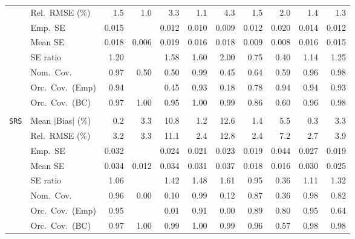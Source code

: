 \begin{landscape}
\begin{longtable}{llrrrrrrrrr}
 & Rel.\ RMSE (\%) & 1.5 & \cellcolor{rankone}1.0 & 3.3 & \cellcolor{ranktwo}1.1 & 4.3 & 1.5 & 2.0 & 1.4 & \cellcolor{rankthree}1.3 \\
 & Emp.\ SE & 0.015 &  & 0.012 & 0.010 & 0.009 & 0.012 & 0.020 & 0.014 & 0.012 \\
 & Mean SE & 0.018 & 0.006 & 0.019 & 0.016 & 0.018 & 0.009 & 0.008 & 0.016 & 0.015 \\
 & SE ratio & \cellcolor{ranktwo}1.20 &  & 1.58 & 1.60 & 2.00 & \cellcolor{rankthree}0.75 & 0.40 & \cellcolor{rankone}1.14 & \cellcolor{rankthree}1.25 \\
 & Nom.\ Cov. & \cellcolor{ranktwo}0.97 & 0.50 & 0.50 & 0.99 & 0.45 & 0.64 & 0.59 & \cellcolor{rankone}0.96 & \cellcolor{rankthree}0.98 \\
 & Orc.\ Cov.\ (Emp) & \cellcolor{rankone}0.94 &  & 0.45 & \cellcolor{ranktwo}0.93 & 0.18 & \cellcolor{rankthree}0.78 & \cellcolor{rankone}0.94 & \cellcolor{rankone}0.94 & \cellcolor{ranktwo}0.93 \\
 & Orc.\ Cov.\ (BC) & \cellcolor{rankthree}0.97 & 1.00 & \cellcolor{rankone}0.95 & 1.00 & 0.99 & 0.86 & 0.60 & \cellcolor{ranktwo}0.96 & 0.98 \\
\addlinespace[2pt]
\multicolumn{11}{l}{\textbf{Continuous Phase-One Covariates}} \\
\addlinespace[2pt]
\quad \texttt{SRS} & Mean $|$Bias$|$ (\%) & \cellcolor{rankone}0.2 & 3.3 & 10.8 & \cellcolor{rankthree}1.2 & 12.6 & 1.4 & 5.5 & \cellcolor{ranktwo}0.3 & 3.3 \\
 & Rel.\ RMSE (\%) & \cellcolor{rankthree}3.2 & 3.3 & 11.1 & \cellcolor{rankone}2.4 & 12.8 & \cellcolor{rankone}2.4 & 7.2 & \cellcolor{ranktwo}2.7 & 3.9 \\
 & Emp.\ SE & 0.032 &  & 0.024 & 0.021 & 0.023 & 0.019 & 0.044 & 0.027 & 0.019 \\
 & Mean SE & 0.034 & 0.012 & 0.034 & 0.031 & 0.037 & 0.018 & 0.016 & 0.030 & 0.025 \\
 & SE ratio & \cellcolor{ranktwo}1.06 &  & 1.42 & 1.48 & 1.61 & \cellcolor{rankone}0.95 & 0.36 & \cellcolor{rankthree}1.11 & 1.32 \\
 & Nom.\ Cov. & \cellcolor{rankone}0.96 & 0.00 & 0.10 & \cellcolor{rankthree}0.99 & 0.12 & 0.87 & 0.36 & \cellcolor{ranktwo}0.98 & 0.82 \\
 & Orc.\ Cov.\ (Emp) & \cellcolor{rankone}0.95 &  & 0.01 & \cellcolor{ranktwo}0.91 & 0.00 & \cellcolor{rankthree}0.89 & 0.80 & \cellcolor{rankone}0.95 & 0.64 \\
 & Orc.\ Cov.\ (BC) & \cellcolor{ranktwo}0.97 & 1.00 & 0.99 & 1.00 & 0.99 & \cellcolor{rankone}0.96 & 0.57 & \cellcolor{rankthree}0.98 & \cellcolor{rankthree}0.98 \\

\end{longtable}
\end{landscape}

